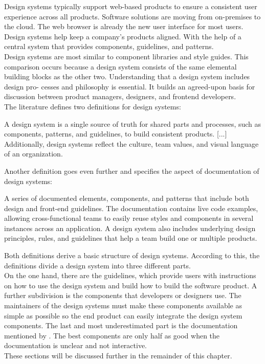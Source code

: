 Design systems typically support web-based products to ensure a consistent user experience across all products. Software solutions are moving from on-premises to the cloud. The web browser is already the new user interface for most users. Design systems help keep a company's products aligned. With the help of a central system that provides components, guidelines, and patterns.  \citep{macdonald_practical_2019} \\
Design systems are most similar to component libraries and style guides. This comparison occurs because a design system consists of the same elemental building blocks as the other two. Understanding that a design system includes design pro- cesses and philosophy is essential. It builds an agreed-upon basis for discussion between product managers, designers, and frontend developers. \cite{vesselov_building_2019} \\
The literature defines two definitions for design systems:
\begin{tcolorbox}[title=Definition of a design system by \citet*{macdonald_practical_2019}]
A design system is a single source of truth for shared parts and processes, such as components, patterns, and guidelines, to build consistent products. [...] Additionally, design systems reflect the culture, team values, and visual language of an organization.
\end{tcolorbox}
Another definition goes even further and specifies the aspect of documentation of design systems:
\begin{tcolorbox}[title=Definition of a design system by \citet*{vesselov_building_2019}]
A series of documented elements, components, and patterns that include both design and front-end guidelines. The documentation contains live code examples, allowing cross-functional teams to easily reuse styles and components in several instances across an application. A design system also includes underlying design principles, rules, and guidelines that help a team build one or multiple products.
\end{tcolorbox}
Both definitions derive a basic structure of design systems. According to this, the definitions divide a design system into three different parts.\\
On the one hand, there are the guidelines, which provide users with instructions on how to use the design system and build how to build the software product. A further subdivision is the components that developers or designers use. The maintainers of the design systems must make these components available as simple as possible so the end product can easily integrate the design system components. The last and most underestimated part is the documentation mentioned by \citet*{vesselov_building_2019}. The best components are only half as good when the documentation is unclear and not interactive. \\
These sections will be discussed further in the remainder of this chapter. \cite{macdonald_practical_2019}\cite{vesselov_building_2019}

